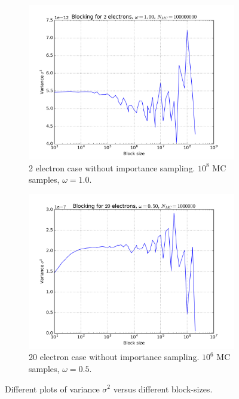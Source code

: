 \documentclass[11pt]{article}
\begin{document}
\begin{figure}[H]
\begin{subfigure}[t]{0.45\textwidth}
        \label{fig:blocking-2e-imp-general-method}
    \end{subfigure}
    \vspace{1cm}
    \begin{subfigure}[t]{0.45\textwidth}
        \centering
        \includegraphics[width=1.0\linewidth]{../figures/figures_to_use/noImp_electron2_omega1_beta1.png} 
        \caption{2 electron case without importance sampling. $10^8$ MC samples, $\omega=1.0$.}
        \label{fig:blocking-2e-no-imp-general-method}
    \end{subfigure}
    \hfill
    \begin{subfigure}[t]{0.45\textwidth}
        \centering
        \includegraphics[width=1.0\linewidth]{../figures/figures_to_use/noImp_electron20_omega05_beta1.png} 
        \caption{20 electron case without importance sampling. $10^6$ MC samples, $\omega=0.5$.}
        \label{fig:blocking-20e-no-imp-general-method}
    \end{subfigure}
    \caption{Different plots of variance $\sigma^2$ versus different block-sizes.}
    \label{fig:blocking-plots}
\end{figure}
\end{document}
